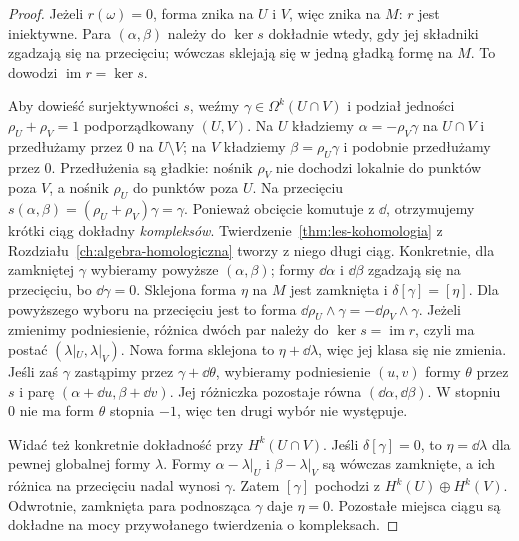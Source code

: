 \begin{proof}
Jeżeli $r(\omega)=0$, forma znika na $U$ i $V$,
więc znika na $M$: $r$ jest iniektywne.
Para $(\alpha,\beta)$ należy do $\ker s$ dokładnie
wtedy, gdy jej składniki zgadzają się na przecięciu;
wówczas sklejają się w jedną gładką formę na $M$.
To dowodzi $\operatorname{im}r=\ker s$.

Aby dowieść surjektywności $s$, weźmy
$\gamma\in\Omega^k(U\cap V)$ i podział jedności
$\rho_U+\rho_V=1$ podporządkowany $(U,V)$.
Na $U$ kładziemy $\alpha=-\rho_V\gamma$ na
$U\cap V$ i przedłużamy przez $0$ na $U\setminus V$;
na $V$ kładziemy $\beta=\rho_U\gamma$
i podobnie przedłużamy przez $0$.
Przedłużenia są gładkie: nośnik $\rho_V$ nie
dochodzi lokalnie do punktów poza $V$, a nośnik
$\rho_U$ do punktów poza $U$. Na przecięciu
$s(\alpha,\beta)=(\rho_U+\rho_V)\gamma=\gamma$.
Ponieważ obcięcie komutuje z $\dd$, otrzymujemy
krótki ciąg dokładny \emph{kompleksów}.
Twierdzenie~\ref{thm:les-kohomologia} z
Rozdziału~\ref{ch:algebra-homologiczna} tworzy
z niego długi ciąg. Konkretnie, dla zamkniętej
$\gamma$ wybieramy powyższe $(\alpha,\beta)$;
formy $\dd\alpha$ i $\dd\beta$ zgadzają się
na przecięciu, bo $\dd\gamma=0$. Sklejona
forma $\eta$ na $M$ jest zamknięta i
$\delta[\gamma]=[\eta]$. Dla powyższego wyboru
na przecięciu jest to forma
$\dd\rho_U\wedge\gamma=-\dd\rho_V\wedge\gamma$.
Jeżeli zmienimy podniesienie, różnica dwóch par
należy do $\ker s=\operatorname{im}r$, czyli ma postać
$(\lambda|_U,\lambda|_V)$. Nowa forma sklejona to
$\eta+\dd\lambda$, więc jej klasa się nie zmienia.
Jeśli zaś $\gamma$ zastąpimy przez $\gamma+\dd\theta$,
wybieramy podniesienie $(u,v)$ formy $\theta$ przez $s$
i parę $(\alpha+\dd u,\beta+\dd v)$.
Jej różniczka pozostaje równa $(\dd\alpha,\dd\beta)$.
W stopniu $0$ nie ma form $\theta$ stopnia $-1$,
więc ten drugi wybór nie występuje.

Widać też konkretnie dokładność przy $H^k(U\cap V)$.
Jeśli $\delta[\gamma]=0$, to $\eta=\dd\lambda$ dla
pewnej globalnej formy $\lambda$. Formy
$\alpha-\lambda|_U$ i $\beta-\lambda|_V$ są wówczas
zamknięte, a ich różnica na przecięciu nadal wynosi
$\gamma$. Zatem $[\gamma]$ pochodzi z $H^k(U)\oplus H^k(V)$.
Odwrotnie, zamknięta para podnosząca $\gamma$ daje
$\eta=0$. Pozostałe miejsca ciągu są dokładne na mocy
przywołanego twierdzenia o kompleksach.
\end{proof}

